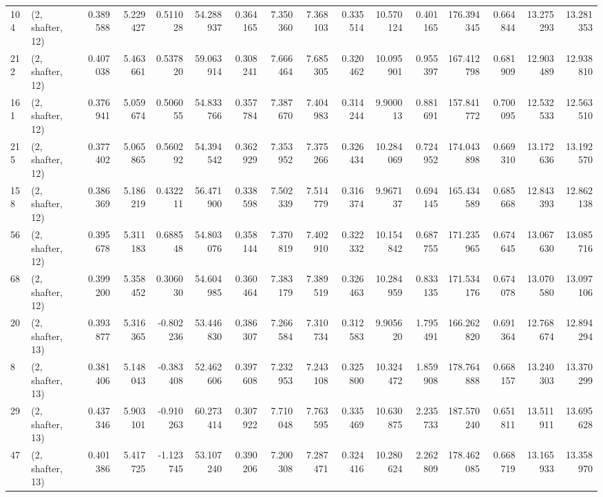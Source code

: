 \begin{tabular}{llrrrrrrrrrrrrrr}
104 &  (2, shafter, 12) &   0.389588 &   5.229427 &  0.511028 &   54.288937 &  0.364165 &   7.350360 &   7.368103 &  0.335514 &  10.570124 &   0.401165 &  176.394345 &  0.664844 &  13.275293 &  13.281353 \\
212 &  (2, shafter, 12) &   0.407038 &   5.463661 &  0.537820 &   59.063914 &  0.308241 &   7.666464 &   7.685305 &  0.320462 &  10.095901 &   0.955397 &  167.412798 &  0.681909 &  12.903489 &  12.938810 \\
161 &  (2, shafter, 12) &   0.376941 &   5.059674 &  0.506055 &   54.833766 &  0.357784 &   7.387670 &   7.404983 &  0.314244 &   9.900013 &   0.881691 &  157.841772 &  0.700095 &  12.532533 &  12.563510 \\
215 &  (2, shafter, 12) &   0.377402 &   5.065865 &  0.560292 &   54.394542 &  0.362929 &   7.353952 &   7.375266 &  0.326434 &  10.284069 &   0.724952 &  174.043898 &  0.669310 &  13.172636 &  13.192570 \\
158 &  (2, shafter, 12) &   0.386369 &   5.186219 &  0.432211 &   56.471900 &  0.338598 &   7.502339 &   7.514779 &  0.316374 &   9.967137 &   0.694145 &  165.434589 &  0.685668 &  12.843393 &  12.862138 \\
56  &  (2, shafter, 12) &   0.395678 &   5.311183 &  0.688548 &   54.803076 &  0.358144 &   7.370819 &   7.402910 &  0.322332 &  10.154842 &   0.687755 &  171.235965 &  0.674645 &  13.067630 &  13.085716 \\
68  &  (2, shafter, 12) &   0.399200 &   5.358452 &  0.306030 &   54.604985 &  0.360464 &   7.383179 &   7.389519 &  0.326463 &  10.284959 &   0.833135 &  171.534176 &  0.674078 &  13.070580 &  13.097106 \\
20  &  (2, shafter, 13) &   0.393877 &   5.316365 & -0.802236 &   53.446830 &  0.386307 &   7.266584 &   7.310734 &  0.312583 &   9.905620 &   1.795491 &  166.262820 &  0.691364 &  12.768674 &  12.894294 \\
8   &  (2, shafter, 13) &   0.381406 &   5.148043 & -0.383408 &   52.462606 &  0.397608 &   7.232953 &   7.243108 &  0.325800 &  10.324472 &   1.859908 &  178.764888 &  0.668157 &  13.240303 &  13.370299 \\
29  &  (2, shafter, 13) &   0.437346 &   5.903101 & -0.910263 &   60.273414 &  0.307922 &   7.710048 &   7.763595 &  0.335469 &  10.630875 &   2.235733 &  187.570240 &  0.651811 &  13.511911 &  13.695628 \\
47  &  (2, shafter, 13) &   0.401386 &   5.417725 & -1.123745 &   53.107240 &  0.390206 &   7.200308 &   7.287471 &  0.324416 &  10.280624 &   2.262809 &  178.462085 &  0.668719 &  13.165933 &  13.358970 \\

\end{tabular}
